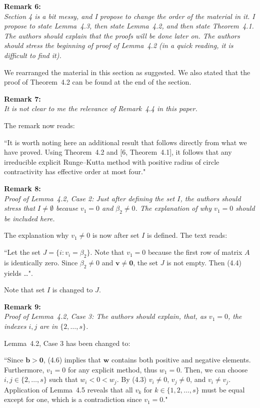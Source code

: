 \documentclass[12pt]{article}
\newcommand{\remark}[2]{\vspace{25pt} \noindent \textbf{Remark #1:\newline} \textit{#2}\vspace{15pt}}
\renewcommand{\newline}{\vspace{15pt}\\}
\newcommand{\david}[1]{\textcolor{red}{\\\textbf{D: \footnotesize #1}\\}}
\begin{document}
\remark{6}{
Section 4 is a bit messy, and I propose to change the order of the material in it. 
I propose to state Lemma~4.3, then state Lemma~4.2, and then state Theorem~4.1. 
The authors should explain that the proofs will be done later on. 
The authors should stress the beginning of proof of Lemma~4.2 (in a quick reading, 
it is difficult to find it).}

We rearranged the material in this section as suggested.
We also stated that the proof of Theorem~4.2 can be found at the end of the section.


\remark{7}{
It is not clear to me the relevance of Remark~4.4 in this paper.}

The remark now reads:

``It is worth noting here an additional result that 
follows directly from what we have proved.
Using Theorem~4.2 and [6, Theorem~4.1], 
it follows that any irreducible explicit Runge--Kutta method with positive radius of
circle contractivity has effective order at most four."

\pagebreak

\remark{8}{
Proof of Lemma~4.2, Case 2: Just after defining the set $I$, the authors should stress that
$I \neq \emptyset$ because $v_1 = 0$ and $\beta_2 \neq 0$.
The explanation of why $v_1 = 0$ should be included
here.}

The explanation why $v_1 \neq 0$ is now after set $I$ is defined. The text reads:

``Let the set $J = \{i : v_i = \beta_2\}$. 
Note that $v_1 = 0$ because the first row of matrix $A$ is identically zero.
Since $\beta_2 \neq 0$ and $ \bm{v} \neq \bm{0}$, the set $J$ is not empty.
Then (4.4) yields \dots".

Note that set $I$ is changed to $J$.
	
\remark{9}{
Proof of Lemma~4.2, Case 3: The authors should explain, that, as $v_1 = 0$, the 
indexes $i,j$ are in $\{2,\dots,s\}$.}

Lemma~4.2, Case 3 has been changed to:

``Since $\bm{b} > \bm{0}$, (4.6) implies that $\bm{w}$ contains both positive 
and negative elements. 
Furthermore, $v_1=0$ for any explicit method, thus $w_1=0$.
Then, we can choose $i, j \in \{2, \dots, s\}$ such that $w_i < 0 < w_j$.
By (4.3) $v_i\ne 0$, $v_j\ne 0$, and $v_i\ne v_j$.
Application of Lemma~4.5 reveals that all $v_k$ for 
$k \in\{1,2,\dots,s\}$ must be equal except for one, which is a contradiction
since $v_1 = 0$."
\end{document}
